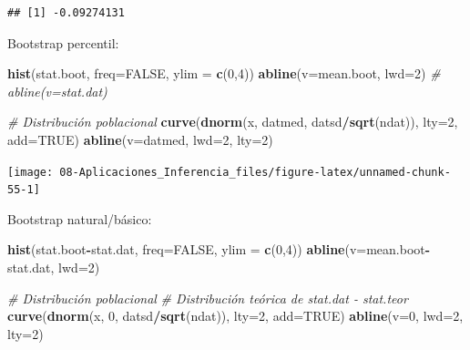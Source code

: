 \documentclass[
]{book}
\newenvironment{Shaded}{\begin{snugshade}}{\end{snugshade}}
\newcommand{\CommentTok}[1]{\textcolor[rgb]{0.56,0.35,0.01}{\textit{#1}}}
\newcommand{\DataTypeTok}[1]{\textcolor[rgb]{0.13,0.29,0.53}{#1}}
\newcommand{\DecValTok}[1]{\textcolor[rgb]{0.00,0.00,0.81}{#1}}
\newcommand{\KeywordTok}[1]{\textcolor[rgb]{0.13,0.29,0.53}{\textbf{#1}}}
\newcommand{\NormalTok}[1]{#1}
\newcommand{\OperatorTok}[1]{\textcolor[rgb]{0.81,0.36,0.00}{\textbf{#1}}}
\newcommand{\OtherTok}[1]{\textcolor[rgb]{0.56,0.35,0.01}{#1}}
\theoremstyle{break}
\theoremstyle{definition}
\theoremstyle{definition}
\theoremstyle{definition}
\theoremstyle{remark}
\begin{document}
\begin{verbatim}
## [1] -0.09274131
\end{verbatim}

Bootstrap percentil:

\begin{Shaded}
\begin{Highlighting}[]
\KeywordTok{hist}\NormalTok{(stat.boot, }\DataTypeTok{freq=}\OtherTok{FALSE}\NormalTok{, }\DataTypeTok{ylim =} \KeywordTok{c}\NormalTok{(}\DecValTok{0}\NormalTok{,}\DecValTok{4}\NormalTok{))}
\KeywordTok{abline}\NormalTok{(}\DataTypeTok{v=}\NormalTok{mean.boot, }\DataTypeTok{lwd=}\DecValTok{2}\NormalTok{)}
\CommentTok{# abline(v=stat.dat)}

\CommentTok{# Distribución poblacional}
\KeywordTok{curve}\NormalTok{(}\KeywordTok{dnorm}\NormalTok{(x, datmed, datsd}\OperatorTok{/}\KeywordTok{sqrt}\NormalTok{(ndat)), }\DataTypeTok{lty=}\DecValTok{2}\NormalTok{, }\DataTypeTok{add=}\OtherTok{TRUE}\NormalTok{)}
\KeywordTok{abline}\NormalTok{(}\DataTypeTok{v=}\NormalTok{datmed, }\DataTypeTok{lwd=}\DecValTok{2}\NormalTok{, }\DataTypeTok{lty=}\DecValTok{2}\NormalTok{)}
\end{Highlighting}
\end{Shaded}

\begin{center}\texttt{[image: 08-Aplicaciones\_Inferencia\_files/figure-latex/unnamed-chunk-55-1]} \end{center}

Bootstrap natural/básico:

\begin{Shaded}
\begin{Highlighting}[]
\KeywordTok{hist}\NormalTok{(stat.boot}\OperatorTok{-}\NormalTok{stat.dat, }\DataTypeTok{freq=}\OtherTok{FALSE}\NormalTok{, }\DataTypeTok{ylim =} \KeywordTok{c}\NormalTok{(}\DecValTok{0}\NormalTok{,}\DecValTok{4}\NormalTok{))}
\KeywordTok{abline}\NormalTok{(}\DataTypeTok{v=}\NormalTok{mean.boot}\OperatorTok{-}\NormalTok{stat.dat, }\DataTypeTok{lwd=}\DecValTok{2}\NormalTok{)}

\CommentTok{# Distribución poblacional}
\CommentTok{# Distribución teórica de stat.dat - stat.teor}
\KeywordTok{curve}\NormalTok{(}\KeywordTok{dnorm}\NormalTok{(x, }\DecValTok{0}\NormalTok{, datsd}\OperatorTok{/}\KeywordTok{sqrt}\NormalTok{(ndat)), }\DataTypeTok{lty=}\DecValTok{2}\NormalTok{, }\DataTypeTok{add=}\OtherTok{TRUE}\NormalTok{)   }
\KeywordTok{abline}\NormalTok{(}\DataTypeTok{v=}\DecValTok{0}\NormalTok{, }\DataTypeTok{lwd=}\DecValTok{2}\NormalTok{, }\DataTypeTok{lty=}\DecValTok{2}\NormalTok{)}
\end{Highlighting}
\end{Shaded}
\end{document}
